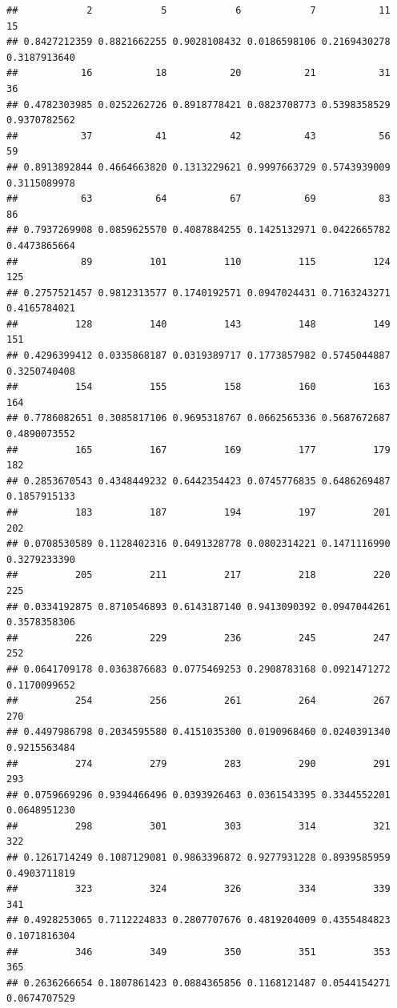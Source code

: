 \documentclass[
]{article}
\begin{document}
\begin{verbatim}
##            2            5            6            7           11           15 
## 0.8427212359 0.8821662255 0.9028108432 0.0186598106 0.2169430278 0.3187913640 
##           16           18           20           21           31           36 
## 0.4782303985 0.0252262726 0.8918778421 0.0823708773 0.5398358529 0.9370782562 
##           37           41           42           43           56           59 
## 0.8913892844 0.4664663820 0.1313229621 0.9997663729 0.5743939009 0.3115089978 
##           63           64           67           69           83           86 
## 0.7937269908 0.0859625570 0.4087884255 0.1425132971 0.0422665782 0.4473865664 
##           89          101          110          115          124          125 
## 0.2757521457 0.9812313577 0.1740192571 0.0947024431 0.7163243271 0.4165784021 
##          128          140          143          148          149          151 
## 0.4296399412 0.0335868187 0.0319389717 0.1773857982 0.5745044887 0.3250740408 
##          154          155          158          160          163          164 
## 0.7786082651 0.3085817106 0.9695318767 0.0662565336 0.5687672687 0.4890073552 
##          165          167          169          177          179          182 
## 0.2853670543 0.4348449232 0.6442354423 0.0745776835 0.6486269487 0.1857915133 
##          183          187          194          197          201          202 
## 0.0708530589 0.1128402316 0.0491328778 0.0802314221 0.1471116990 0.3279233390 
##          205          211          217          218          220          225 
## 0.0334192875 0.8710546893 0.6143187140 0.9413090392 0.0947044261 0.3578358306 
##          226          229          236          245          247          252 
## 0.0641709178 0.0363876683 0.0775469253 0.2908783168 0.0921471272 0.1170099652 
##          254          256          261          264          267          270 
## 0.4497986798 0.2034595580 0.4151035300 0.0190968460 0.0240391340 0.9215563484 
##          274          279          283          290          291          293 
## 0.0759669296 0.9394466496 0.0393926463 0.0361543395 0.3344552201 0.0648951230 
##          298          301          303          314          321          322 
## 0.1261714249 0.1087129081 0.9863396872 0.9277931228 0.8939585959 0.4903711819 
##          323          324          326          334          339          341 
## 0.4928253065 0.7112224833 0.2807707676 0.4819204009 0.4355484823 0.1071816304 
##          346          349          350          351          353          365 
## 0.2636266654 0.1807861423 0.0884365856 0.1168121487 0.0544154271 0.0674707529 

\end{verbatim}
\end{document}
